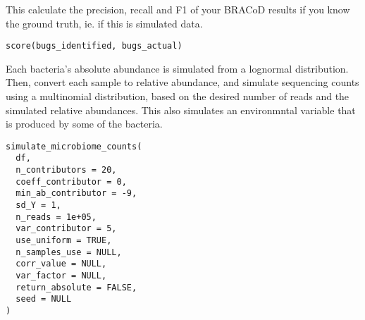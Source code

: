 \documentclass[letterpaper]{book}
\begin{document}
%
\begin{Description}\relax
This calculate the precision, recall and F1 of your BRACoD results if you know
the ground truth, ie. if this is simulated data.
\end{Description}
%
\begin{Usage}
\begin{verbatim}
score(bugs_identified, bugs_actual)
\end{verbatim}
\end{Usage}
%
\begin{Description}\relax
Each bacteria's absolute abundance is simulated from a lognormal distribution.
Then, convert each sample to relative abundance, and simulate sequencing counts
using a multinomial distribution, based on the desired number of reads and the
simulated relative abundances. This also simulates an environmntal variable that
is produced by some of the bacteria.
\end{Description}
%
\begin{Usage}
\begin{verbatim}
simulate_microbiome_counts(
  df,
  n_contributors = 20,
  coeff_contributor = 0,
  min_ab_contributor = -9,
  sd_Y = 1,
  n_reads = 1e+05,
  var_contributor = 5,
  use_uniform = TRUE,
  n_samples_use = NULL,
  corr_value = NULL,
  var_factor = NULL,
  return_absolute = FALSE,
  seed = NULL
)
\end{verbatim}
\end{Usage}
%
\end{document}
